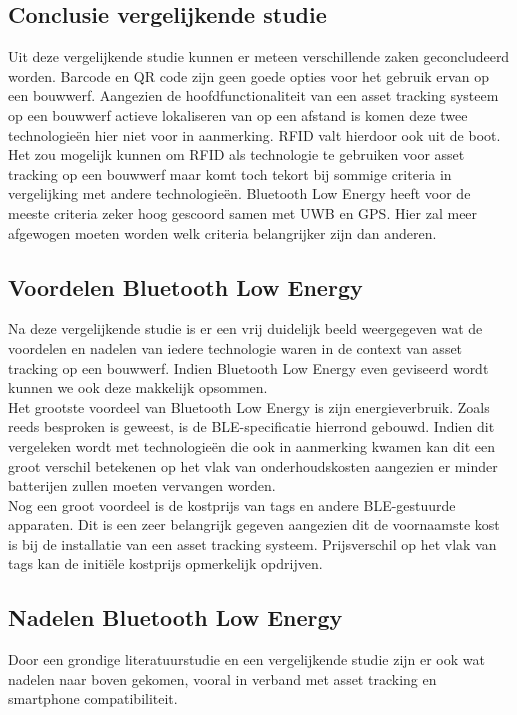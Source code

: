 \subsection{Conclusie vergelijkende studie}
Uit deze vergelijkende studie kunnen er meteen verschillende zaken geconcludeerd worden. Barcode en QR code zijn geen goede opties voor het gebruik ervan op een bouwwerf. Aangezien de hoofdfunctionaliteit van een asset tracking systeem op een bouwwerf actieve lokaliseren van op een afstand is komen deze twee technologieën hier niet voor in aanmerking.
RFID valt hierdoor ook uit de boot. Het zou mogelijk kunnen om RFID als technologie te gebruiken voor asset tracking op een bouwwerf maar komt toch tekort bij sommige criteria in vergelijking met andere technologieën. Bluetooth Low Energy heeft voor de meeste criteria zeker hoog gescoord samen met UWB en GPS. Hier zal meer afgewogen moeten worden welk criteria belangrijker zijn dan anderen.

\subsection{Voordelen Bluetooth Low Energy}
Na deze vergelijkende studie is er een vrij duidelijk beeld weergegeven wat de voordelen en nadelen van iedere technologie waren in de context van asset tracking op een bouwwerf. Indien Bluetooth Low Energy even geviseerd wordt kunnen we ook deze makkelijk opsommen.\\

Het grootste voordeel van Bluetooth Low Energy is zijn energieverbruik. Zoals reeds besproken is geweest, is de BLE-specificatie hierrond gebouwd. Indien dit vergeleken wordt met technologieën die ook in aanmerking kwamen kan dit een groot verschil betekenen op het vlak van onderhoudskosten aangezien er minder batterijen zullen moeten vervangen worden.\\

Nog een groot voordeel is de kostprijs van tags en andere BLE-gestuurde apparaten. Dit is een zeer belangrijk gegeven aangezien dit de voornaamste kost is bij de installatie van een asset tracking systeem. Prijsverschil op het vlak van tags kan de initiële kostprijs opmerkelijk opdrijven.\\

\subsection{Nadelen Bluetooth Low Energy}
Door een grondige literatuurstudie en een vergelijkende studie zijn er ook wat nadelen naar boven gekomen, vooral in verband met asset tracking en smartphone compatibiliteit.\\


